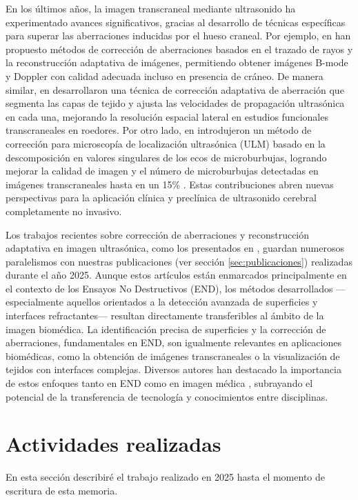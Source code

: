 \documentclass[10pt,a4paper]{article}
\begin{document}
En los últimos años, la imagen transcraneal mediante ultrasonido ha experimentado avances significativos, gracias al desarrollo de técnicas específicas para superar las aberraciones inducidas por el hueso craneal. Por ejemplo, en  
\cite{Mozaf2022}
 han propuesto métodos de corrección de aberraciones basados en el trazado de rayos y la reconstrucción adaptativa de imágenes, permitiendo obtener imágenes B-mode y Doppler con calidad adecuada incluso en presencia de cráneo. De manera similar, en 
  \cite{Waasdorp2025} 
 desarrollaron una técnica de corrección adaptativa de aberración que segmenta las capas de tejido y ajusta las velocidades de propagación ultrasónica en cada una, mejorando la resolución espacial lateral en estudios funcionales transcraneales en roedores. Por otro lado, en \cite{Blanvillain2025}
  introdujeron un método de corrección para microscopía de localización ultrasónica (ULM) basado en la descomposición en valores singulares de los ecos de microburbujas, logrando mejorar la calidad de imagen y el número de microburbujas detectadas en imágenes transcraneales hasta en un 15\% . Estas contribuciones abren nuevas perspectivas para la aplicación clínica y preclínica de ultrasonido cerebral completamente no invasivo.

Los trabajos recientes sobre corrección de aberraciones y reconstrucción adaptativa en imagen ultrasónica, como los presentados en \cite{Mozaf2022, Waasdorp2025}, 
guardan numerosos paralelismos con nuestras publicaciones \cite{Cosarinsky2025, Munoz2025} (ver sección \ref{sec:publicaciones})
realizadas durante el año 2025. Aunque estos artículos están enmarcados principalmente en el contexto de los Ensayos No Destructivos (END), los métodos desarrollados —especialmente aquellos orientados a la detección avanzada de superficies y interfaces refractantes— resultan directamente transferibles al ámbito de la imagen biomédica. La identificación precisa de superficies y la corrección de aberraciones, fundamentales en END, son igualmente relevantes en aplicaciones biomédicas, como la obtención de imágenes transcraneales o la visualización de tejidos con interfaces complejas. Diversos autores han destacado la importancia de estos enfoques tanto en END como en imagen médica \cite{Dia2025, Kerr2017, Yuan2025}
, subrayando el potencial de la transferencia de tecnología y conocimientos entre disciplinas.



\section{Actividades realizadas}\label{sec:actividades}
En esta sección describiré el trabajo realizado en 2025 hasta el momento de escritura de esta memoria.
\end{document}
